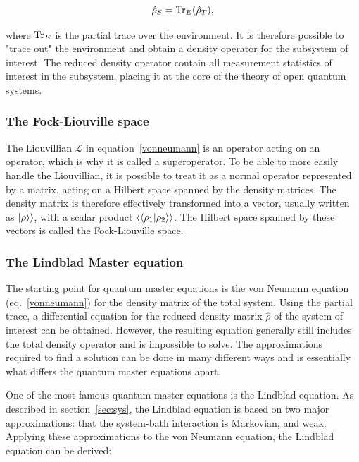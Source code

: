 \documentclass[../main.tex]{subfiles}
\begin{document}
\begin{equation}
    \hat\rho_S = \operatorname{Tr}_E({\hat\rho_T}),
\end{equation}

where $\operatorname{Tr}_E$ is the partial trace over the environment. It is therefore possible to "trace out" the environment and obtain a density operator for the subsystem of interest. The reduced density operator contain all measurement statistics of interest in the subsystem, placing it at the core of the theory of open quantum systems.

\subsubsection{The Fock-Liouville space}
The Liouvillian $\mathcal{L}$ in equation~\eqref{vonneumann} is an operator acting on an operator, which is why it is called a superoperator. To be able to more easily handle the Liouvillian, it is possible to treat it as a normal operator represented by a matrix, acting on a Hilbert space spanned by the density matrices. The density matrix is therefore effectively transformed into a vector, usually written as $\ket{\rho}\rangle$, with a scalar product $\langle\braket{\rho_1|\rho_2}\rangle$. The Hilbert space spanned by these vectors is called the Fock-Liouville space.

\subsubsection{The Lindblad Master equation}\label{sec:lind}
The starting point for quantum master equations is the von Neumann equation (eq.~\eqref{vonneumann}) for the density matrix of the total system. Using the partial trace, a differential equation for the reduced density matrix $\hat\rho$ of the system of interest can be obtained. However, the resulting equation generally still includes the total density operator and is impossible to solve. The approximations required to find a solution can be done in many different ways and is essentially what differs the quantum master equations apart.

One of the most famous quantum master equations is the Lindblad equation. As described in section~\ref{sec:sys}, the Lindblad equation is based on two major approximations: that the system-bath interaction is Markovian, and weak.
Applying these approximations to the von Neumann equation, the Lindblad equation can be derived:
\end{document}
